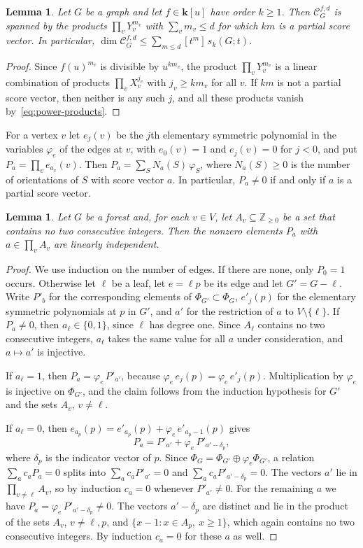 \documentclass[reqno]{article}
\theoremstyle{plain} %
\newtheorem{lemma}[theorem]{Lemma}
\theoremstyle{definition}
\theoremstyle{remark}
\newcommand{\Z}{{\mathbb{Z}}}
\newcommand{\K} {\mathbf{k}}
\newcommand {\CC}{\mathscr{C}}
\numberwithin{equation}{section}
\begin{document}
\begin{lemma}\label{lem:degenerate-upper}
Let $G$ be a graph and let $f\in\K[u]$ have order $k\ge1$. Then
$\CC_G^{f,d}$ is spanned by the products $\prod_vY_v^{m_v}$ with
$\sum_vm_v\le d$ for which $km$ is a partial score vector. In particular,
$\dim\CC_G^{f,d}\le\sum_{m\le d}[t^m]\,s_k(G;t)$.
\end{lemma}
\begin{proof}
Since $f(u)^{m_v}$ is divisible by $u^{km_v}$, the product
$\prod_vY_v^{m_v}$ is a linear combination of products $\prod_vX_v^{j_v}$
with $j_v\ge km_v$ for all $v$. If $km$ is not a partial score vector,
then neither is any such $j$, and all these products vanish
by~\eqref{eq:power-products}.
\end{proof}

For a vertex $v$ let $e_j(v)$ be the $j$th elementary symmetric
polynomial in the variables $\varphi_e$ of the edges at $v$, with
$e_0(v)=1$ and $e_j(v)=0$ for $j<0$, and put $P_a=\prod_ve_{a_v}(v)$.
Then $P_a=\sum_SN_a(S)\,\varphi_S$, where $N_a(S)\ge0$ is the number of
orientations of $S$ with score vector $a$. In particular, $P_a\ne0$ if
and only if $a$ is a partial score vector.

\begin{lemma}\label{lem:no-consecutive}
Let $G$ be a forest and, for each $v\in V$, let $A_v\subseteq\Z_{\ge0}$
be a set that contains no two consecutive integers. Then the nonzero
elements $P_a$ with $a\in\prod_vA_v$ are linearly independent.
\end{lemma}
\begin{proof}
We use induction on the number of edges. If there are none, only
$P_0=1$ occurs. Otherwise let $\ell$ be a leaf, let $e=\ell p$ be its
edge and let $G'=G-\ell$. Write $P'_b$ for the corresponding elements of
$\Phi_{G'}\subset\Phi_G$, $e'_j(p)$ for the elementary symmetric
polynomials at $p$ in $G'$, and $a'$ for the restriction of $a$ to
$V\setminus\{\ell\}$. If $P_a\ne0$, then $a_\ell\in\{0,1\}$, since $\ell$
has degree one. Since $A_\ell$ contains no two consecutive integers,
$a_\ell$ takes the same value for all $a$ under consideration, and
$a\mapsto a'$ is injective.

If $a_\ell=1$, then $P_a=\varphi_e\,P'_{a'}$, because $\varphi_e\,e_j(p)=\varphi_e\,e'_j(p)$.
Multiplication by $\varphi_e$ is injective on $\Phi_{G'}$, and the claim
follows from the induction hypothesis for $G'$ and the sets $A_v$,
$v\ne\ell$.

If $a_\ell=0$, then $e_{a_p}(p)=e'_{a_p}(p)+\varphi_e\,e'_{a_p-1}(p)$
gives
\[
 P_a=P'_{a'}+\varphi_e\,P'_{a'-\delta_p},
\]
where $\delta_p$ is the indicator vector of $p$. Since
$\Phi_G=\Phi_{G'}\oplus\varphi_e\Phi_{G'}$, a relation
$\sum_ac_aP_a=0$ splits into $\sum_ac_aP'_{a'}=0$ and
$\sum_ac_aP'_{a'-\delta_p}=0$. The vectors $a'$ lie in
$\prod_{v\ne\ell}A_v$, so by induction $c_a=0$ whenever
$P'_{a'}\ne0$. For the remaining $a$ we have
$P_a=\varphi_e\,P'_{a'-\delta_p}\ne0$. The vectors $a'-\delta_p$ are
distinct and lie in the product of the sets $A_v$, $v\ne\ell,p$, and
$\{x-1:x\in A_p,\ x\ge1\}$, which again contains no two consecutive
integers. By induction $c_a=0$ for these $a$ as well.
\end{proof}
\end{document}
